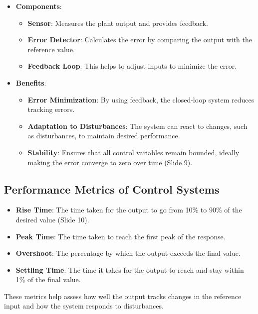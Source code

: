 \documentclass[
  14pt,
  a4paper,
  numbers=noendperiod,
  headinclude=true,
  footinclude=true,
  DIV=calc]{scrreprt}
\begin{document}
\begin{itemize}
\item
  \textbf{Components}:

  \begin{itemize}
  \item
    \textbf{Sensor}: Measures the plant output and provides feedback.
  \item
    \textbf{Error Detector}: Calculates the error by comparing the
    output with the reference value.
  \item
    \textbf{Feedback Loop}: This helps to adjust inputs to minimize the
    error.
  \end{itemize}
\item
  \textbf{Benefits}:

  \begin{itemize}
  \item
    \textbf{Error Minimization}: By using feedback, the closed-loop
    system reduces tracking errors.
  \item
    \textbf{Adaptation to Disturbances}: The system can react to
    changes, such as disturbances, to maintain desired performance.
  \item
    \textbf{Stability}: Ensures that all control variables remain
    bounded, ideally making the error converge to zero over time (Slide
    9).
  \end{itemize}
\end{itemize}

\subsection{Performance Metrics of Control
Systems}\label{performance-metrics-of-control-systems}

\begin{itemize}
\item
  \textbf{Rise Time}: The time taken for the output to go from 10\% to
  90\% of the desired value (Slide 10).
\item
  \textbf{Peak Time}: The time taken to reach the first peak of the
  response.
\item
  \textbf{Overshoot}: The percentage by which the output exceeds the
  final value.
\item
  \textbf{Settling Time}: The time it takes for the output to reach and
  stay within 1\% of the final value.
\end{itemize}

These metrics help assess how well the output tracks changes in the
reference input and how the system responds to disturbances.
\end{document}
